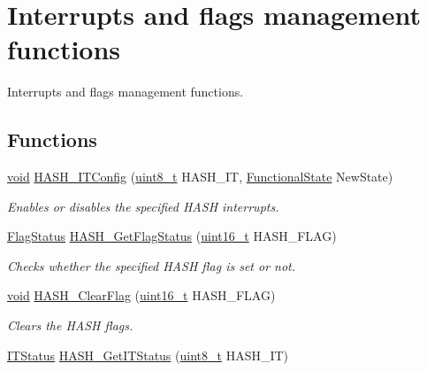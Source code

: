\hypertarget{group___h_a_s_h___group5}{\section{Interrupts and flags management functions}
\label{group___h_a_s_h___group5}
}


Interrupts and flags management functions.  


\subsection*{Functions}
\begin{DoxyCompactItemize}
\item 
\hyperlink{group___n_a_m_e_ga18028b8badbf1ea7e704ccac3c488e82}{void} \hyperlink{group___h_a_s_h___group5_gaed111ba67a4f4afc8c9cf389adc574ac}{H\-A\-S\-H\-\_\-\-I\-T\-Config} (\hyperlink{stdint_8h_aba7bc1797add20fe3efdf37ced1182c5}{uint8\-\_\-t} H\-A\-S\-H\-\_\-\-I\-T, \hyperlink{group___exported__types_gac9a7e9a35d2513ec15c3b537aaa4fba1}{Functional\-State} New\-State)
\begin{DoxyCompactList}\small\item\em Enables or disables the specified H\-A\-S\-H interrupts. \end{DoxyCompactList}\item 
\hyperlink{group___exported__types_ga89136caac2e14c55151f527ac02daaff}{Flag\-Status} \hyperlink{group___h_a_s_h___group5_gae994fb4be1977f6ebb823f38839f7bd1}{H\-A\-S\-H\-\_\-\-Get\-Flag\-Status} (\hyperlink{stdint_8h_a273cf69d639a59973b6019625df33e30}{uint16\-\_\-t} H\-A\-S\-H\-\_\-\-F\-L\-A\-G)
\begin{DoxyCompactList}\small\item\em Checks whether the specified H\-A\-S\-H flag is set or not. \end{DoxyCompactList}\item 
\hyperlink{group___n_a_m_e_ga18028b8badbf1ea7e704ccac3c488e82}{void} \hyperlink{group___h_a_s_h___group5_ga0ec1269a1f30a1e7be0e3045d72ebcf6}{H\-A\-S\-H\-\_\-\-Clear\-Flag} (\hyperlink{stdint_8h_a273cf69d639a59973b6019625df33e30}{uint16\-\_\-t} H\-A\-S\-H\-\_\-\-F\-L\-A\-G)
\begin{DoxyCompactList}\small\item\em Clears the H\-A\-S\-H flags. \end{DoxyCompactList}\item 
\hyperlink{group___exported__types_gaacbd7ed539db0aacd973a0f6eca34074}{I\-T\-Status} \hyperlink{group___h_a_s_h___group5_ga49a9d1ad196112cd3614b8c428a4c4cf}{H\-A\-S\-H\-\_\-\-Get\-I\-T\-Status} (\hyperlink{stdint_8h_aba7bc1797add20fe3efdf37ced1182c5}{uint8\-\_\-t} H\-A\-S\-H\-\_\-\-I\-T)

\end{DoxyCompactItemize}

